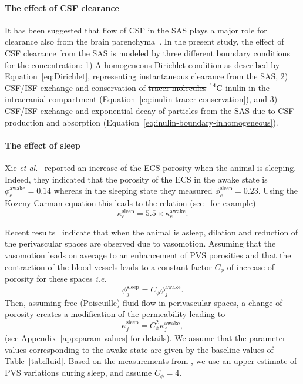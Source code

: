 \documentclass[10pt]{article}
\newcommand{\ie}{\emph{i.e.}\;}
\newcommand{\etal}{\emph{et al.}\;}
\newcommand{\1}{^{(1)}}
\newcommand{\2}{^{(2)}}
\newcommand{\Cinulin}{$\prescript{14}{}{\text{C}}$-inulin }
\providecommand{\DIFdeltex}[1]{{\protect\color{red}\sout{#1}}}                      %
\providecommand{\DIFaddbegin}{} %
\providecommand{\DIFaddend}{} %
\providecommand{\DIFdelbegin}{} %
\providecommand{\DIFdelend}{} %
\providecommand{\DIFdel}[1]{\texorpdfstring{\DIFdeltex{#1}}{}} %
\newcommand{\DIFscaledelfig}{0.5}
\newlength{\DIFdelgraphicswidth} %
\newlength{\DIFdelgraphicsheight} %
\newcommand{\DIFaddincludegraphics}[2][]{{\color{blue}\fbox{\DIFOincludegraphics[#1]{#2}}}} %
\newcommand{\DIFdelincludegraphics}[2][]{%
\sbox{\DIFdelgraphicsbox}{\DIFOincludegraphics[#1]{#2}}%
\settoboxwidth{\DIFdelgraphicswidth}{\DIFdelgraphicsbox} %
\settoboxtotalheight{\DIFdelgraphicsheight}{\DIFdelgraphicsbox} %
\scalebox{\DIFscaledelfig}{%
\parbox[b]{\DIFdelgraphicswidth}{\usebox{\DIFdelgraphicsbox}\\[-\baselineskip] \rule{\DIFdelgraphicswidth}{0em}}\llap{\resizebox{\DIFdelgraphicswidth}{\DIFdelgraphicsheight}{%
\setlength{\unitlength}{\DIFdelgraphicswidth}%
\begin{picture}(1,1)%
\thicklines\linethickness{2pt} %
{\color[rgb]{1,0,0}\put(0,0){\framebox(1,1){}}}%
{\color[rgb]{1,0,0}\put(0,0){\line( 1,1){1}}}%
{\color[rgb]{1,0,0}\put(0,1){\line(1,-1){1}}}%
\end{picture}%
}\hspace*{3pt}}} %
} %
\DeclareRobustCommand{\DIFaddbegin}{\DIFOaddbegin \let\includegraphics\DIFaddincludegraphics} %
\DeclareRobustCommand{\DIFaddend}{\DIFOaddend \let\includegraphics\DIFOincludegraphics} %
\DeclareRobustCommand{\DIFdelbegin}{\DIFOdelbegin \let\includegraphics\DIFdelincludegraphics} %
\DeclareRobustCommand{\DIFdelend}{\DIFOaddend \let\includegraphics\DIFOincludegraphics} %
\begin{document}
\DIFaddend \paragraph{The effect of CSF clearance}
It has been suggested that flow of CSF in the SAS plays a major role for clearance also from the brain parenchyma~\cite{proulx2021cerebrospinal, hornkjol2022csf}. In the present study, the effect of CSF clearance from the SAS is modeled by three different boundary conditions for the concentration: 1) A homogeneous Dirichlet condition as described by Equation~\eqref{eq:Dirichlet}, representing instantaneous clearance from the SAS, 2) CSF/ISF exchange and conservation of \DIFdelbegin \DIFdel{tracer molecules }\DIFdelend \DIFaddbegin \Cinulin \DIFaddend in the intracranial compartment (Equation~\eqref{eq:inulin-tracer-conservation}), and 3) CSF/ISF exchange and exponential decay of particles from the SAS due to CSF production and absorption (Equation~\eqref{eq:inulin-boundary-inhomogeneous}).

\paragraph{The effect of sleep}
Xie \etal~\cite{Xie_2013_sleep} reported an increase of the ECS porosity when the animal is sleeping. Indeed, they indicated that the porosity of the ECS in the awake state is $\phi_e^\text{awake} = 0.14$ whereas in the sleeping state they measured $\phi_e^\text{sleep}=0.23$. Using the Kozeny-Carman equation this leads to the relation (see~\cite{tithof-2022-glymphatic} for example)
\[
    \kappa_e^{\text{sleep}}= 5.5\times \kappa_e^\text{awake}.
\]

Recent results~\cite{Bojarskaite2022} indicate that when the animal is asleep, dilation and reduction  of the perivascular spaces are observed due to vasomotion. Assuming that the vasomotion leads on average to an enhancement of PVS porosities and that the contraction of the blood vessels leads to a constant factor $C_\phi$ of increase of porosity for these spaces \ie 
\[
    \phi^\text{sleep}_j = C_\phi \phi_j^\text{awake}.
\]
Then, assuming free (Poiseuille) fluid flow in perivascular spaces, a change of porosity creates a modification of the permeability leading to 
\[
    \kappa_j^\text{sleep} = C_\phi^2 \kappa_j^\text{awake},
\]
(see Appendix~\ref{app:param-values} for details).
We assume that the parameter values corresponding to the awake state are given by the baseline values of Table~\ref{tab:fluid}. Based on the measurements from \cite{Bojarskaite2022}, we use an upper estimate of PVS variations during sleep, and assume $C_\phi=4$.
\end{document}
